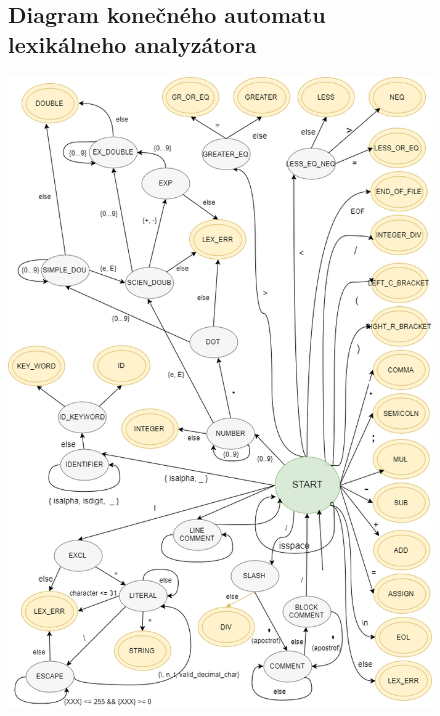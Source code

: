\documentclass[11pt,a4paper]{article}
\begin{document}
	\begin{figure}
	\subsection{Diagram konečného automatu lexikálneho analyzátora}
		\includegraphics[scale=0.65]{scanner}
	\end{figure}
	
\end{document}
